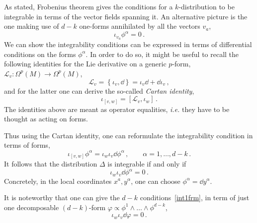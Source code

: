 \documentclass[debug]{phd}
\begin{document}
					As stated, Frobenius theorem gives the conditions for a $k$-distribution to be integrable in terms of the vector fields spanning it.
					An alternative picture is the one making use of $d-k$ one-forms annihilated by all the vectors $v_a$,
							\begin{equation}
								\iota_{v_a} \phi^\alpha = 0\, .
							\end{equation}
					We can show the integrability conditions can be expressed in terms of differential conditions on the forms $\phi^\alpha$.
					In order to do so, it might be useful to recall the following identities for the Lie derivative on a generic $p$-form, $\mathcal{L}_v : \Omega^p(M) \rightarrow \Omega^p (M)$,
							\begin{equation}
								\mathcal{L}_v = \left\{\iota_v, \dd \right\} = \iota_v \dd + \dd \iota_v \, ,
							\end{equation}
					and for the latter one can derive the so-called \emph{Cartan identity},
							\begin{equation}
								\iota_{[v, w]} = \left[\mathcal{L}_v, \iota_w \right] \, .
							\end{equation}
					The identities above are meant as operator equalities, \emph{i.e.} they have to be thought as acting on forms.
					
					Thus using the Cartan identity, one can reformulate the integrability condition in terms of forms,
							\begin{equation}
								\iota_{[v,w]} \phi^\alpha = \iota_w \iota_v \dd \phi^\alpha \, , \qquad \alpha =1, \ldots, d-k \, .
							\end{equation}
					It follows that the distribution $\Delta$ is integrable if and only if
							\begin{equation}\label{int1frm}
								\iota_w \iota_v \dd \phi^\alpha = 0 \, .
							\end{equation}
					Concretely, in the local coordinates $x^a, y^\alpha$, one can choose $\phi^\alpha = \dd y^\alpha$.
					
					It is noteworthy that one can give the $d-k$ conditions~\eqref{int1frm}, in term of just one decomposable $(d-k)$-form $\varphi \propto \phi^1 \wedge \ldots \wedge \phi^{d-k}$,
							\begin{equation}
								\iota_w \iota_v \dd \varphi = 0 \, .
							\end{equation}
					
\end{document}
